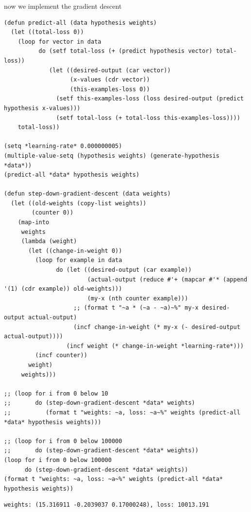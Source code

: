 \documentclass[a4paper,12pt]{article}
\begin{document}
now we implement the gradient descent\\
\lstset{language=Lisp,label= ,caption= ,captionpos=b,numbers=none}
\begin{lstlisting}
(defun predict-all (data hypothesis weights)
  (let ((total-loss 0))
    (loop for vector in data
          do (setf total-loss (+ (predict hypothesis vector) total-loss))
             (let ((desired-output (car vector))
                   (x-values (cdr vector))
                   (this-examples-loss 0))
               (setf this-examples-loss (loss desired-output (predict hypothesis x-values)))
               (setf total-loss (+ total-loss this-examples-loss))))
    total-loss))

(setq *learning-rate* 0.000000005)
(multiple-value-setq (hypothesis weights) (generate-hypothesis *data*))
(predict-all *data* hypothesis weights)

(defun step-down-gradient-descent (data weights)
  (let ((old-weights (copy-list weights))
        (counter 0))
    (map-into
     weights
     (lambda (weight)
       (let ((change-in-weight 0))
         (loop for example in data
               do (let ((desired-output (car example))
                        (actual-output (reduce #'+ (mapcar #'* (append '(1) (cdr example)) old-weights)))
                        (my-x (nth counter example)))
                    ;; (format t "~a * (~a - ~a)~%" my-x desired-output actual-output)
                    (incf change-in-weight (* my-x (- desired-output actual-output))))
                  (incf weight (* change-in-weight *learning-rate*)))
         (incf counter))
       weight)
     weights)))

;; (loop for i from 0 below 10
;;       do (step-down-gradient-descent *data* weights)
;;          (format t "weights: ~a, loss: ~a~%" weights (predict-all *data* hypothesis weights)))

;; (loop for i from 0 below 100000
;;       do (step-down-gradient-descent *data* weights))
(loop for i from 0 below 100000
      do (step-down-gradient-descent *data* weights))
(format t "weights: ~a, loss: ~a~%" weights (predict-all *data* hypothesis weights))
\end{lstlisting}

\begin{verbatim}
weights: (15.316911 -0.2039037 0.17000248), loss: 10013.191
\end{verbatim}
\end{document}
